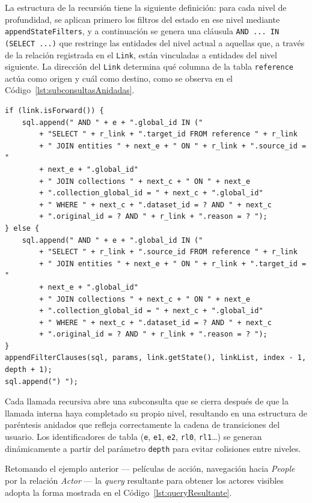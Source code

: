 La estructura de la recursión tiene la siguiente definición: para cada nivel de profundidad, se aplican
primero los filtros del estado en ese nivel mediante \texttt{appendStateFilters}, y a
continuación se genera una cláusula \texttt{AND ... IN (SELECT ...)} que restringe las
entidades del nivel actual a aquellas que, a través de la relación registrada en el
\texttt{Link}, están vinculadas a entidades del nivel siguiente. La dirección del
\texttt{Link} determina qué columna de la tabla \texttt{reference} actúa como origen y
cuál como destino, como se observa en el Código~\ref{lst:subconsultasAnidadas}.

\begin{lstlisting}[style=javaStyle, caption=Subconsultas anidadas, label=lst:subconsultasAnidadas]
if (link.isForward()) {
    sql.append(" AND " + e + ".global_id IN ("
        + "SELECT " + r_link + ".target_id FROM reference " + r_link
        + " JOIN entities " + next_e + " ON " + r_link + ".source_id = "
        + next_e + ".global_id"
        + " JOIN collections " + next_c + " ON " + next_e
        + ".collection_global_id = " + next_c + ".global_id"
        + " WHERE " + next_c + ".dataset_id = ? AND " + next_c
        + ".original_id = ? AND " + r_link + ".reason = ? ");
} else {
    sql.append(" AND " + e + ".global_id IN ("
        + "SELECT " + r_link + ".source_id FROM reference " + r_link
        + " JOIN entities " + next_e + " ON " + r_link + ".target_id = "
        + next_e + ".global_id"
        + " JOIN collections " + next_c + " ON " + next_e
        + ".collection_global_id = " + next_c + ".global_id"
        + " WHERE " + next_c + ".dataset_id = ? AND " + next_c
        + ".original_id = ? AND " + r_link + ".reason = ? ");
}
appendFilterClauses(sql, params, link.getState(), linkList, index - 1, depth + 1);
sql.append(") ");
\end{lstlisting}

Cada llamada recursiva abre una subconsulta que se cierra después de que la llamada
interna haya completado su propio nivel, resultando en una estructura de paréntesis
anidados que refleja correctamente la cadena de transiciones del usuario. Los identificadores de tabla
(\texttt{e}, \texttt{e1}, \texttt{e2}, \texttt{rl0}, \texttt{rl1}\ldots) se generan
dinámicamente a partir del parámetro \texttt{depth} para evitar colisiones entre niveles.

Retomando el ejemplo anterior --- películas de acción, navegación hacia \textit{People}
por la relación \textit{Actor} --- la \textit{query} resultante para obtener los actores visibles
adopta la forma mostrada en el Código~\ref{lst:queryResultante}.

